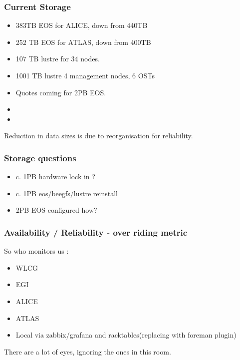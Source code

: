 \documentclass{beamer}
\begin{document}
\begin{frame}
  \frametitle{Current Storage}
  \begin{itemize}
    \item 383TB EOS for ALICE, down from 440TB
    \item 252 TB EOS for ATLAS, down from 400TB
    \item 107 TB lustre for 34 nodes.
    \item 1001 TB lustre 4 management nodes, 6 OSTs
    \item Quotes coming for 2PB EOS.
    \item \color{red}{400TB ALICE}
    \item \color{red}{400TB ATLAS}
  \end{itemize}
Reduction in data sizes is due to reorganisation for reliability.
\end{frame}


\begin{frame}
\frametitle{Storage questions}
    \begin{itemize}
        \item c. 1PB hardware lock in ?
        \item c. 1PB eos/beegfs/lustre reinstall
        \item 2PB EOS configured how?
    \end{itemize}
\end{frame}


\begin{frame}
  \frametitle{Availability / Reliability - over riding metric}
  So who monitors us :
  \begin{itemize}
    \item WLCG
    \item EGI
    \item ALICE
    \item ATLAS
    \item Local via zabbix/grafana and racktables(replacing with foreman plugin)
  \end{itemize}
There are a lot of eyes, ignoring the ones in this room.\\
\vspace{0.5cm}
\vspace{0.5cm}
\end{frame}
\end{document}
